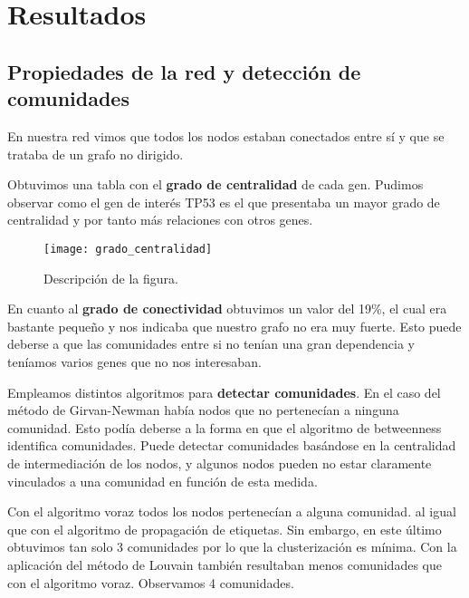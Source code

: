 
\section{Resultados}

\subsection{Propiedades de la red y detección de comunidades}

En nuestra red vimos que todos los nodos estaban conectados entre sí y que se trataba de un grafo no dirigido.

\vspace{3pt}

Obtuvimos una tabla con el \textbf{grado de centralidad} de cada gen. Pudimos observar como el gen de interés TP53 es el que presentaba un mayor grado de centralidad y por tanto más relaciones con otros genes. 
\begin{figure}
	\centering
	\texttt{[image: grado\_centralidad]}
	\caption{Descripción de la figura.}
	\label{fig:grado_centralidad}
\end{figure}


\vspace{3pt}

En cuanto al \textbf{grado de conectividad} obtuvimos un valor del 19\%, el cual era bastante pequeño y nos indicaba que nuestro grafo no era muy fuerte. Esto puede deberse a que las comunidades entre si no tenían una gran dependencia y teníamos varios genes que no nos interesaban. 

\vspace{3pt}

Empleamos distintos algoritmos para \textbf{detectar comunidades}. En el caso del método de Girvan-Newman había nodos que no pertenecían a ninguna comunidad. Esto podía deberse a la forma en que el algoritmo de betweenness identifica comunidades. Puede detectar comunidades basándose en la centralidad de intermediación de los nodos, y algunos nodos pueden no estar claramente vinculados a una comunidad en función de esta medida.

\vspace{3pt}

Con el algoritmo voraz todos los nodos pertenecían a alguna comunidad. al igual que con el algoritmo de propagación de etiquetas. Sin embargo, en este último obtuvimos tan solo 3 comunidades por lo que la clusterización es mínima.  Con la aplicación del método de Louvain también resultaban menos comunidades que con el algoritmo voraz. Observamos 4 comunidades. 

